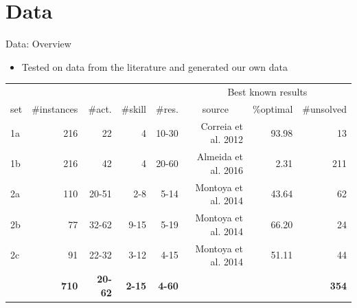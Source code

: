 \documentclass{beamer}
\begin{document}
\section{Data}
\begin{frame}{Data: Overview}
	\begin{itemize}
		\item Tested on data from the literature and generated our own data\pause
	\end{itemize}
\begin{table}[tpb]
	\begin{adjustwidth}{-0.5cm}{}
    \setlength{\tabcolsep}{3pt}
    \centering
    \small
	\begin{tabular}{@{}lrrrrrrr@{}}
		\toprule
		&  &  &  &  & \multicolumn{3}{c}{Best known results}\\ 
        \cmidrule(l){6-8} 
		set & \multicolumn{1}{l}{\#instances} & \#act. & \#skill & \#res. & \multicolumn{1}{c}{source} & \multicolumn{1}{r}{\%optimal} & {\color{red} \#unsolved} \\ \midrule\midrule
		1a     & 216 & 22 & 4 & 10-30 & Correia et al. 2012 & 93.98 & {\color{red} 13}\\
		1b     & 216& 42 & 4 & 20-60 & Almeida et al. 2016 & 2.31 & {\color{red} 211} \\ \midrule\pause
		2a     & 110 & 20-51 & 2-8 & 5-14 & Montoya et al. 2014 & 43.64 & {\color{red} 62} \\
		2b     & 77 & 32-62 & 9-15 & 5-19 & Montoya et al. 2014 & 66.20 & {\color{red} 24} \\
		2c     & 91 & 22-32 & 3-12 & 4-15 & Montoya et al. 2014 & 51.11 & {\color{red} 44} \\ \midrule\midrule\pause
		& {\bf 710} & {\bf 20-62} & {\bf 2-15} & {\bf 4-60} & & & {\bf {\color{red} 354}} \\\bottomrule
	\end{tabular}
    \end{adjustwidth}
	\label{tab:data}
\end{table}

\end{frame}
\end{document}
